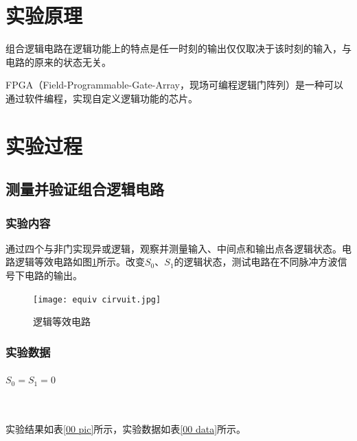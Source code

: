 \documentclass[UTF8]{ctexart}
\numberwithin{figure}{subsection}
\numberwithin{table}{subsection}
\numberwithin{equation}{subsection}
\begin{document}
\section{实验原理}
\par 组合逻辑电路在逻辑功能上的特点是任一时刻的输出仅仅取决于该时刻的输入，与电路的原来的状态无关。
\par FPGA（Field-Programmable-Gate-Array，现场可编程逻辑门阵列）是一种可以通过软件编程，实现自定义逻辑功能的芯片。

\section{实验过程}
\subsection{测量并验证组合逻辑电路}
\subsubsection{实验内容}
\par 通过四个与非门实现异或逻辑，观察并测量输入、中间点和输出点各逻辑状态。电路逻辑等效电路如图\ref{logic eqiv circuit}所示。改变\(S_0\)、\(S_1\)的逻辑状态，测试电路在不同脉冲方波信号下电路的输出。

\begin{figure}[H]
    \begin{center}
        \texttt{[image: equiv cirvuit.jpg]}
    \end{center}
    \caption{逻辑等效电路}
    \label{logic eqiv circuit}
\end{figure}

\subsubsection{实验数据}
\paragraph{\(S_0  = S_1 = 0\)}~
\par 实验结果如表\ref{00 pic}所示，实验数据如表\ref{00 data}所示。
\end{document}
